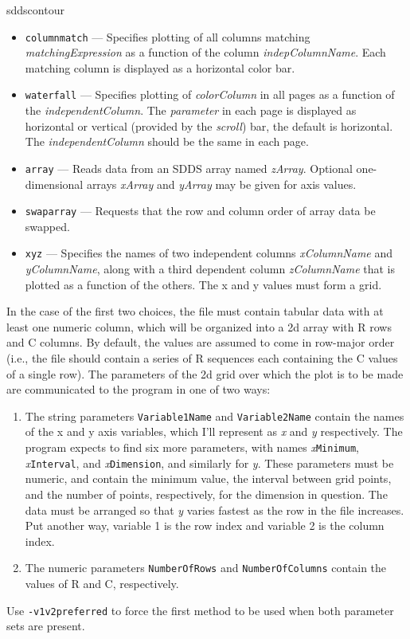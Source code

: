 \begin{sddsprog}{sddscontour}
\begin{itemize}
\begin{itemize}
        \item \verb|columnmatch| --- Specifies plotting of all columns matching {\em matchingExpression}
        as a function of the column {\em indepColumnName}.  Each matching column is displayed as a horizontal
        color bar.
        \item \verb|waterfall| --- Specifies plotting of {\em colorColumn} in all pages as a function of the
        {\em independentColumn}. The {\em parameter} in each page is displayed as horizontal or vertical (provided
        by the {\em scroll}) bar, the default is horizontal. The {\em independentColumn} should be the same in
        each page.
        \item \verb|array| --- Reads data from an SDDS array named {\em zArray}.  Optional one-dimensional arrays
          {\em xArray} and {\em yArray} may be given for axis values.
        \item \verb|swaparray| --- Requests that the row and column order of array data be swapped.
        \item \verb|xyz| --- Specifies the names of two independent columns {\em xColumnName} and {\em yColumnName}, along with
          a third dependent column {\em zColumnName} that is plotted as a function of the others.
          The x and y values must form a grid.
        \end{itemize}

        In the case of the first two choices, the file must contain
tabular data with at least one numeric column, which will be organized
into a 2d array with R rows and C columns.  By default, the values are
assumed to come in row-major order (i.e., the file should contain a
series of R sequences each containing the C values of a single row).
The parameters of the 2d grid over which the plot is to be made are
communicated to the program in one of two ways:

\begin{enumerate}

\item The string parameters \verb|Variable1Name| and \verb|Variable2Name| contain the names of the
x and y axis variables, which I'll represent as {\em x} and {\em y} respectively.  The program expects to find
six more parameters, with names {\em x}\verb|Minimum|, {\em x}\verb|Interval|, and {\em x}\verb|Dimension|,
and similarly for {\em y}.  These parameters must be numeric, and contain the minimum value, the interval
between grid points, and the number of points, respectively, for the dimension in question.
The data must be arranged so that {\em y} varies fastest as the row in the file increases.  Put another
way, variable 1 is the row index and variable 2 is the column index.
\item The numeric parameters \verb|NumberOfRows| and \verb|NumberOfColumns| contain the values of R and
C, respectively.
\end{enumerate}
Use \verb|-v1v2preferred| to force the first method to be used when both parameter sets are present.


\end{itemize}
\end{sddsprog}
